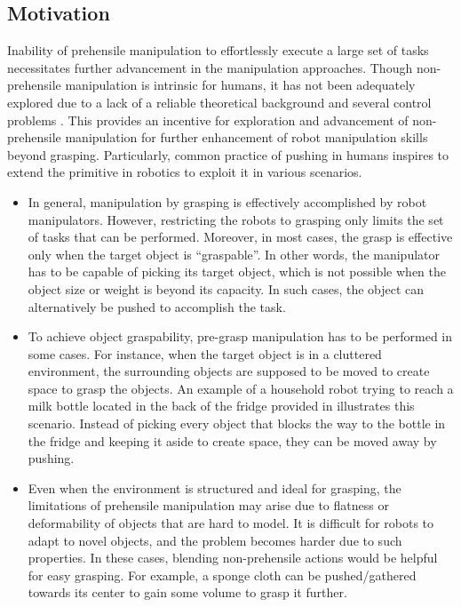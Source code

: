 \documentclass[rnd]{mas_proposal}
\begin{document}
\subsection{Motivation}
Inability of prehensile manipulation to effortlessly execute a large set of tasks necessitates further advancement in the manipulation approaches. Though non-prehensile manipulation is intrinsic for humans, it has not been adequately explored due to a lack of a reliable theoretical background \cite{ruggiero2018nonprehensile} and several control problems \cite{lynch2003control}. This provides an incentive for exploration and advancement of non-prehensile manipulation for further enhancement of robot manipulation skills beyond grasping. Particularly, common practice of pushing in humans inspires to extend the primitive in robotics to exploit it in various scenarios. 
\begin{itemize}
\item In general, manipulation by grasping is effectively accomplished by robot manipulators. However, restricting the robots to grasping only limits the set of tasks that can be performed. Moreover, in most cases, the grasp is effective only when the target object is \enquote{graspable}. In other words, the manipulator has to be capable of picking its target object, which is not possible when the object size or weight is beyond its capacity. In such cases, the object can alternatively be pushed to accomplish the task. 

\item To achieve object graspability, pre-grasp manipulation has to be performed in some cases. For instance, when the target object is in a cluttered environment, the surrounding objects are supposed to be moved to create space to grasp the objects. An example of a household robot trying to reach a milk bottle located in the back of the fridge provided in \cite{stuber2019let} illustrates this scenario. Instead of picking every object that blocks the way to the bottle in the fridge and keeping it aside to create space, they can be moved away by pushing. 

\item Even when the environment is structured and ideal for grasping, the limitations of prehensile manipulation may arise due to flatness or deformability of objects that are hard to model. It is difficult for robots to adapt to novel objects, and the problem becomes harder due to such properties. In these cases, blending non-prehensile actions would be helpful for easy grasping. For example, a sponge cloth can be pushed/gathered towards its center to gain some volume to grasp it further.


\end{itemize}
\end{document}

